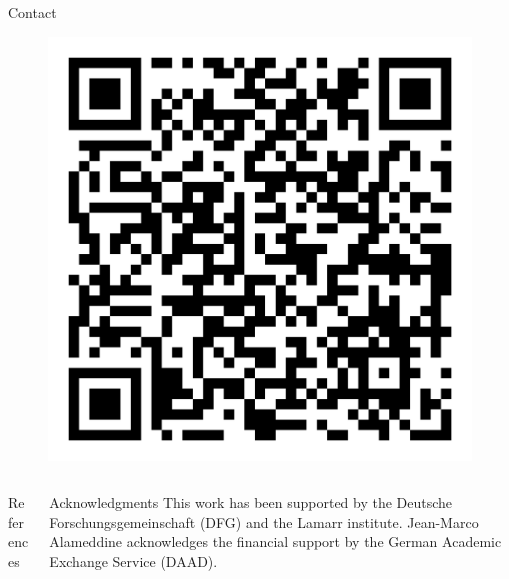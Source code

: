\documentclass[t]{beamer}
\begin{document}
\begin{columns}[onlytextwidth]
\begin{column}{0.4\textwidth}
\begin{block}[equal height group=Z]{Contact}
\begin{center}
\begin{figure}[ht]
            \begin{minipage}[ht]{0.24\linewidth}
              \centering
                \includegraphics[width=0.66\linewidth, valign=t]{images/qr_proposal.png}
            \end{minipage}
          \end{figure}
        \end{center}
      \end{block}
    \end{column}
    \end{columns}

  \vspace*{\fill}
  \begin{columns}[onlytextwidth]%
    \begin{column}{0.75\textwidth}%
      \begin{alertblock}[equal height group=bottom, fonttitle=\normalsize]{References}
        \begin{multicols}{3}
          \footnotesize%
          \printbibliography%
        \end{multicols}
      \end{alertblock}
    \end{column}
    \begin{column}{0.25\textwidth}%
      \begin{alertblock}[equal height group=bottom, fonttitle=\normalsize]{Acknowledgments}
          \footnotesize%
          This work has been supported by the Deutsche Forschungsgemeinschaft (DFG) and the Lamarr institute.
          Jean-Marco Alameddine acknowledges the financial support by the German Academic Exchange Service (DAAD).
      \end{alertblock}
    \end{column}
  \end{columns}

\end{document}

